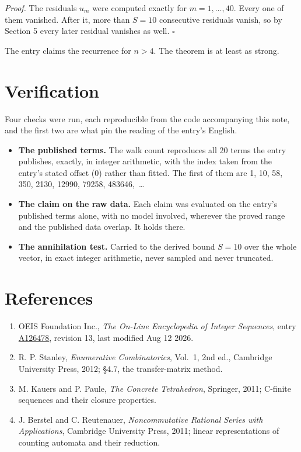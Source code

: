 \documentclass[11pt]{article}
\theoremstyle{definition}
\begin{document}
{\itshape Proof.} The residuals $u_m$ were computed exactly for $m = 1,\dots,40$. Every one of them vanished. After it, more than $S = 10$ consecutive residuals vanish, so by Section 5 every later residual vanishes as well. $\square$

The entry claims the recurrence for $n > 4$. The theorem is at least as strong.

\section{Verification}

Four checks were run, each reproducible from the code accompanying this note, and the first two are what pin the reading of the entry's English.

\begin{itemize}

\item {\bfseries The published terms.} The walk count reproduces all 20 terms the entry publishes, exactly, in integer arithmetic, with the index taken from the entry's stated offset (0) rather than fitted. The first of them are 1, 10, 58, 350, 2130, 12990, 79258, 483646,~\dots

\item {\bfseries The claim on the raw data.} Each claim was evaluated on the entry's published terms alone, with no model involved, wherever the proved range and the published data overlap. It holds there.

\item {\bfseries The annihilation test.} Carried to the derived bound $S = 10$ over the whole vector, in exact integer arithmetic, never sampled and never truncated.

\end{itemize}

\section{References}

\begin{enumerate}

\item OEIS Foundation Inc., \emph{The On-Line Encyclopedia of Integer Sequences}, entry \href{https://oeis.org/A126478}{A126478}, revision 13, last modified Aug 12 2026.

\item R. P. Stanley, \emph{Enumerative Combinatorics}, Vol.~1, 2nd ed., Cambridge University Press, 2012; \S4.7, the transfer-matrix method.

\item M. Kauers and P. Paule, \emph{The Concrete Tetrahedron}, Springer, 2011; C-finite sequences and their closure properties.

\item J. Berstel and C. Reutenauer, \emph{Noncommutative Rational Series with Applications}, Cambridge University Press, 2011; linear representations of counting automata and their reduction.

\end{enumerate}
\end{document}
